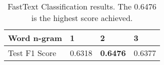 \documentclass[11pt]{article}
\begin{document}
\begin{table}[h]
	\centering
	
	
	\begin{tabular}{|l|l|l|l|}
		\hline
		Word n-gram   & 1      & 2               & 3      \\ \hline
		Test F1 Score & 0.6318 & \textbf{0.6476} & 0.6377 \\ \hline
	\end{tabular}
	\caption{FastText Classification results. The 0.6476 is the highest score achieved.}
	\label{fasttextClassification}
\end{table}




















 
\end{document}
